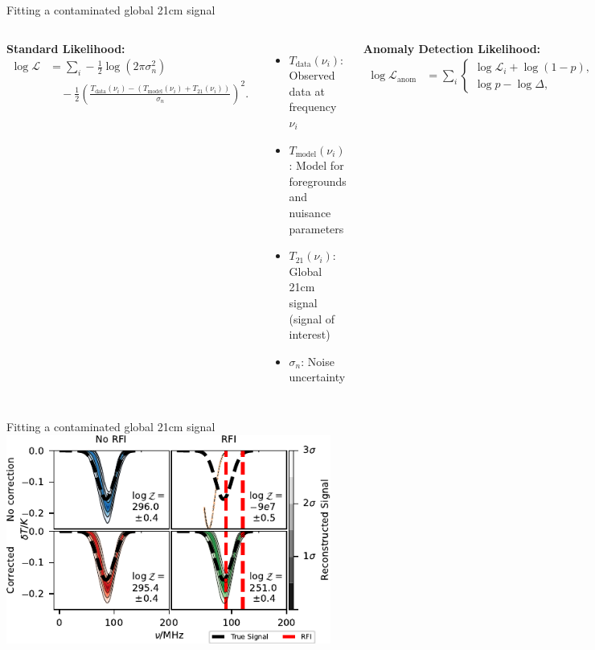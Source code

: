 \documentclass[aspectratio=169]{beamer}
\begin{document}
\begin{frame}{Fitting a contaminated global 21cm signal}

  \footnotesize
  \begin{columns}
    \textbf{Standard Likelihood:}
    \begin{align*}
      \log \mathcal{L} &= \sum_i -\frac{1}{2}\log \left(2\pi\sigma_n^2\right) \\
      &\quad - \frac{1}{2} \left(\frac{T_{\text{data}}(\nu_i) - (T_{\text{model}}(\nu_i) + T_{21}(\nu_i))}{\sigma_n}\right)^2.
    \end{align*}
    \begin{itemize}
      \item $T_{\text{data}}(\nu_i)$: Observed data at frequency $\nu_i$
      \item $T_{\text{model}}(\nu_i)$: Model for foregrounds and nuisance parameters
      \item $T_{21}(\nu_i)$: Global 21cm signal (signal of interest)
      \item $\sigma_n$: Noise uncertainty
    \end{itemize}

    \textbf{Anomaly Detection Likelihood:}
    \begin{align*}
      \log \mathcal{L}_{\text{anom}} &= \sum_i \begin{cases}
        \log \mathcal{L}_i + \log(1-p), & \text{if } e_i^{\max} \\
        \log p - \log \Delta, & \text{otherwise}
      \end{cases}
    \end{align*}
    \begin{itemize}
      \item $\log \mathcal{L}_i$: Point-wise standard likelihood
      \item $p$: Anomaly probability (model parameter)
      \item $e_i^{\max}$: Boolean indicating normal data
      \item $\Delta$: Maximum value of the data range
    \end{itemize}
  \end{columns}
\end{frame}

\begin{frame}{Fitting a contaminated global 21cm signal}
  \centering \includegraphics[width=0.8\textwidth]{images/4pane_reach_sidebar.pdf}
\end{frame}
\end{document}
